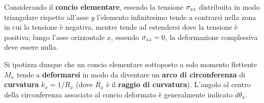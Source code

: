 		Considerando il \textbf{concio elementare}, essendo la tensione $\sigma_{zz}$ distribuita in modo triangolare rispetto all'asse $y$ l'elemento infinitesimo tende a contrarsi nella zona in cui la tensione è negativa, mentre tende ad estendersi dove la tensione è positiva; lungo l'asse orizzontale $x$, essendo $\sigma_{zz} = 0$, la deformazione complessiva deve essere nulla.
		
		
		\begin{concetto}
			Si ipotizza dunque che un concio elementare sottoposto a solo momento flettente $M_x$ tende a \textbf{deformarsi} in modo da diventare un \textbf{arco di circonferenza} di \textbf{curvatura} $k_x = 1/R_x$ (dove $R_x$ è il \textbf{raggio di curvatura}). L'angolo al centro della circonferenza associato al concio deformato è generalmente indicato $d\theta_x$.
		\end{concetto}
		
